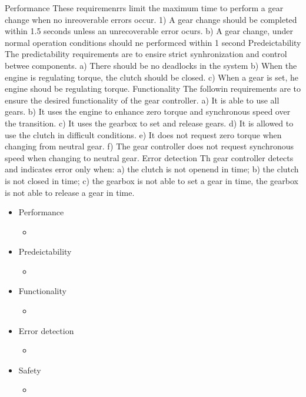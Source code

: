 Performance
These requiremenrrs limit the maximum time to perform a gear change when no inreoverable errors occur.
1) A gear change should be completed within 1.5 seconds unless an unrecoverable error ocurs.
b) A gear change, under normal operation conditions should ne performced within 1 second
Predeictability
The predictability requirements are to ensire strict synhronization and control betwee components.
a) There should be no deadlocks in the system
b) When the engine is regulating torque, the clutch should be closed.
c) When a gear is set, he engine shoud  be regulating torque.
Functionality
The followin requirements are to ensure the desired functionality of the gear controller.
a) It is able to use all gears.
b) It uses the engine to enhance zero torque and synchronous speed over the transition.
c) It uses the gearbox to set and release gears.
d) It is allowed to use the clutch in difficult conditions.
e) It does not request zero torque when changing from neutral gear.
f) The gear controller does not request synchronous speed when changing to neutral gear.
Error detection
Th gear controller detects and indicates error only when:
a) the clutch is not openend in time;
b) the clutch is not closed in time;
c) the gearbox is not able to set a gear in time,
the gearbox is not able to release a gear in time.



\begin{itemize}
	\item Performance
	\begin{itemize}
		\item 
	\end{itemize}

	\item Predeictability
	\begin{itemize}
		\item 
	\end{itemize}


	\item Functionality
	\begin{itemize}
		\item 
	\end{itemize}

	\item Error detection
	\begin{itemize}
		\item 
	\end{itemize}

	\item Safety
	\begin{itemize}
		\item 
	\end{itemize}
	
\end{itemize}



